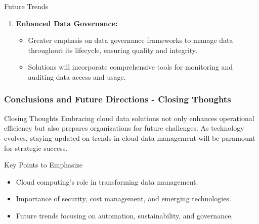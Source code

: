 \documentclass[aspectratio=169]{beamer}
\begin{document}
\begin{frame}[fragile]
\begin{block}{Future Trends}
\begin{enumerate}
            \item \textbf{Enhanced Data Governance:}
            \begin{itemize}
                \item Greater emphasis on data governance frameworks to manage data throughout its lifecycle, ensuring quality and integrity.
                \item Solutions will incorporate comprehensive tools for monitoring and auditing data access and usage.
            \end{itemize}
        \end{enumerate}
    \end{block}
\end{frame}

\begin{frame}[fragile]
    \frametitle{Conclusions and Future Directions - Closing Thoughts}
    \begin{block}{Closing Thoughts}
        Embracing cloud data solutions not only enhances operational efficiency but also prepares organizations for future challenges. 
        As technology evolves, staying updated on trends in cloud data management will be paramount for strategic success.
    \end{block}
    
    \begin{block}{Key Points to Emphasize}
        \begin{itemize}
            \item Cloud computing's role in transforming data management.
            \item Importance of security, cost management, and emerging technologies.
            \item Future trends focusing on automation, sustainability, and governance.
        \end{itemize}
    \end{block}
\end{frame}
\end{document}
